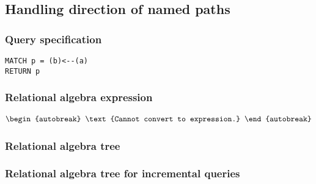 
\subsection{Handling direction of named paths}

\subsubsection*{Query specification}

\begin{lstlisting}
MATCH p = (b)<--(a)
RETURN p
\end{lstlisting}

\subsubsection*{Relational algebra expression}

\begin{align*}
\begin{autobreak}
\text{Cannot convert to expression.}
\end{autobreak}
\end{align*}

\subsubsection*{Relational algebra tree}


\subsubsection*{Relational algebra tree for incremental queries}

